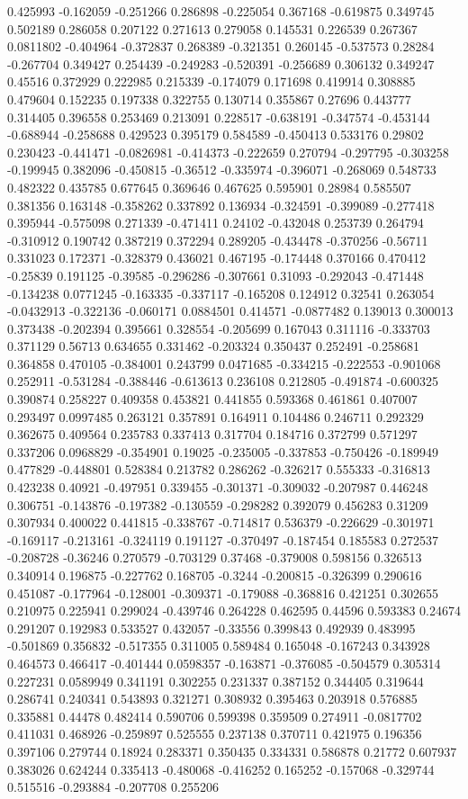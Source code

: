 0.425993 -0.162059 -0.251266 0.286898 -0.225054 0.367168 -0.619875 0.349745 0.502189 0.286058 0.207122 0.271613 0.279058 0.145531 0.226539 0.267367 0.0811802 -0.404964 -0.372837 0.268389 -0.321351 0.260145 -0.537573 0.28284 -0.267704 0.349427 0.254439 -0.249283 -0.520391 -0.256689 0.306132 0.349247 0.45516 0.372929 0.222985 0.215339 -0.174079 0.171698 0.419914 0.308885 0.479604 0.152235 0.197338 0.322755 0.130714 0.355867 0.27696 0.443777 0.314405 0.396558 0.253469 0.213091 0.228517 -0.638191 -0.347574 -0.453144 -0.688944 -0.258688 0.429523 0.395179 0.584589 -0.450413 0.533176 0.29802 0.230423 -0.441471 -0.0826981 -0.414373 -0.222659 0.270794 -0.297795 -0.303258 -0.199945 0.382096 -0.450815 -0.36512 -0.335974 -0.396071 -0.268069 0.548733 0.482322 0.435785 0.677645 0.369646 0.467625 0.595901 0.28984 0.585507 0.381356 0.163148 -0.358262 0.337892 0.136934 -0.324591 -0.399089 -0.277418 0.395944 -0.575098 0.271339 -0.471411 0.24102 -0.432048 0.253739 0.264794 -0.310912 0.190742 0.387219 0.372294 0.289205 -0.434478 -0.370256 -0.56711 0.331023 0.172371 -0.328379 0.436021 0.467195 -0.174448 0.370166 0.470412 -0.25839 0.191125 -0.39585 -0.296286 -0.307661 0.31093 -0.292043 -0.471448 -0.134238 0.0771245 -0.163335 -0.337117 -0.165208 0.124912 0.32541 0.263054 -0.0432913 -0.322136 -0.060171 0.0884501 0.414571 -0.0877482 0.139013 0.300013 0.373438 -0.202394 0.395661 0.328554 -0.205699 0.167043 0.311116 -0.333703 0.371129 0.56713 0.634655 0.331462 -0.203324 0.350437 0.252491 -0.258681 0.364858 0.470105 -0.384001 0.243799 0.0471685 -0.334215 -0.222553 -0.901068 0.252911 -0.531284 -0.388446 -0.613613 0.236108 0.212805 -0.491874 -0.600325 0.390874 0.258227 0.409358 0.453821 0.441855 0.593368 0.461861 0.407007 0.293497 0.0997485 0.263121 0.357891 0.164911 0.104486 0.246711 0.292329 0.362675 0.409564 0.235783 0.337413 0.317704 0.184716 0.372799 0.571297 0.337206 0.0968829 -0.354901 0.19025 -0.235005 -0.337853 -0.750426 -0.189949 0.477829 -0.448801 0.528384 0.213782 0.286262 -0.326217 0.555333 -0.316813 0.423238 0.40921 -0.497951 0.339455 -0.301371 -0.309032 -0.207987 0.446248 0.306751 -0.143876 -0.197382 -0.130559 -0.298282 0.392079 0.456283 0.31209 0.307934 0.400022 0.441815 -0.338767 -0.714817 0.536379 -0.226629 -0.301971 -0.169117 -0.213161 -0.324119 0.191127 -0.370497 -0.187454 0.185583 0.272537 -0.208728 -0.36246 0.270579 -0.703129 0.37468 -0.379008 0.598156 0.326513 0.340914 0.196875 -0.227762 0.168705 -0.3244 -0.200815 -0.326399 0.290616 0.451087 -0.177964 -0.128001 -0.309371 -0.179088 -0.368816 0.421251 0.302655 0.210975 0.225941 0.299024 -0.439746 0.264228 0.462595 0.44596 0.593383 0.24674 0.291207 0.192983 0.533527 0.432057 -0.33556 0.399843 0.492939 0.483995 -0.501869 0.356832 -0.517355 0.311005 0.589484 0.165048 -0.167243 0.343928 0.464573 0.466417 -0.401444 0.0598357 -0.163871 -0.376085 -0.504579 0.305314 0.227231 0.0589949 0.341191 0.302255 0.231337 0.387152 0.344405 0.319644 0.286741 0.240341 0.543893 0.321271 0.308932 0.395463 0.203918 0.576885 0.335881 0.44478 0.482414 0.590706 0.599398 0.359509 0.274911 -0.0817702 0.411031 0.468926 -0.259897 0.525555 0.237138 0.370711 0.421975 0.196356 0.397106 0.279744 0.18924 0.283371 0.350435 0.334331 0.586878 0.21772 0.607937 0.383026 0.624244 0.335413 -0.480068 -0.416252 0.165252 -0.157068 -0.329744 0.515516 -0.293884 -0.207708 0.255206 